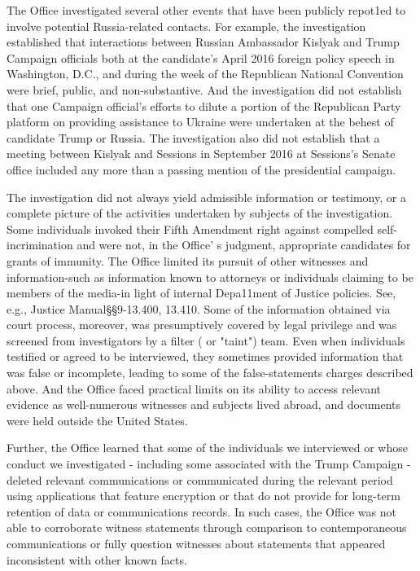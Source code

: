 \documentclass{article}
\begin{document}
The Office investigated several other events that have been publicly repot1ed to involve potential Russia-related contacts.
For example, the investigation established that interactions between Russian Ambassador Kislyak and Trump Campaign officials both at the candidate's April 2016 foreign policy speech in Washington, D.C., and during the week of the Republican National Convention were brief, public, and non-substantive.
And the investigation did not establish that one Campaign official's efforts to dilute a portion of the Republican Party platform on providing assistance to Ukraine were undertaken at the behest of candidate Trump or Russia.
The investigation also did not establish that a meeting between Kislyak and Sessions in September 2016 at Sessions's Senate office included any more than a passing mention of the presidential campaign.

The investigation did not always yield admissible information or testimony, or a complete picture of the activities undertaken by subjects of the investigation.
Some individuals invoked their Fifth Amendment right against compelled self-incrimination and were not, in the Office' s judgment, appropriate candidates for grants of immunity.
The Office limited its pursuit of other witnesses and information-such as information known to attorneys or individuals claiming to be members of the media-in light of internal Depa11ment of Justice policies.
See, e.g., Justice Manual\S\S 9-13.400, 13.410. Some of the information obtained via court process, moreover, was presumptively covered by legal privilege and was screened from investigators by a filter ( or "taint") team.
Even when individuals testified or agreed to be interviewed, they sometimes provided information that was false or incomplete, leading to some of the false-statements charges described above.
And the Office faced practical limits on its ability to access relevant evidence as well-numerous witnesses and subjects lived abroad, and documents were held outside the United States.

Further, the Office learned that some of the individuals we interviewed or whose conduct we investigated - including some associated with the Trump Campaign - deleted relevant communications or communicated during the relevant period using applications that feature encryption or that do not provide for long-term retention of data or communications records.
In such cases, the Office was not able to corroborate witness statements through comparison to contemporaneous communications or fully question witnesses about statements that appeared inconsistent with other known facts.
\end{document}
